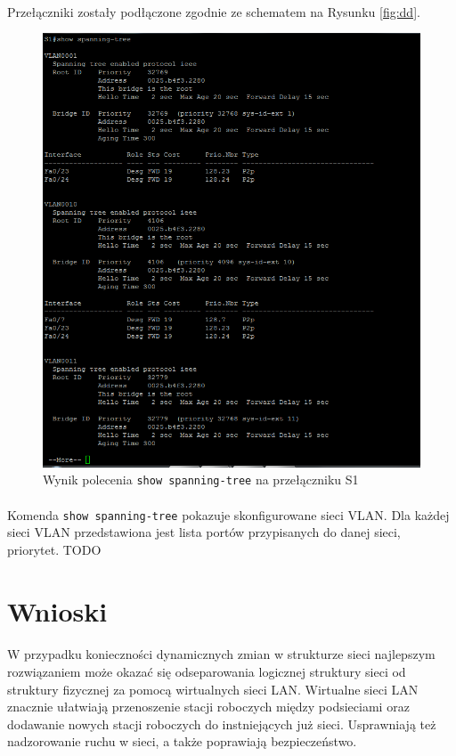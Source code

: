 \documentclass[wide,a4paper,titlepage,12pt] {article}
\begin{document}
  \paragraph{}
  Przełączniki zostały podłączone zgodnie ze schematem na Rysunku \ref{fig:dd}.

  \begin{figure}[H]
    \begin{center}
      \includegraphics[width=\textwidth]{img/t13.PNG}
      \caption{Wynik polecenia \texttt{show spanning-tree} na przełączniku S1}
    \end{center}
  \end{figure}

  \paragraph{}
  Komenda \texttt{show spanning-tree} pokazuje skonfigurowane sieci VLAN. Dla każdej sieci VLAN przedstawiona jest lista portów przypisanych do danej sieci, priorytet. TODO


  \section{Wnioski}
  \paragraph{}
  W przypadku konieczności dynamicznych zmian w strukturze sieci najlepszym rozwiązaniem może okazać się odseparowania logicznej struktury sieci od struktury fizycznej za pomocą wirtualnych sieci LAN.
  Wirtualne sieci LAN znacznie ułatwiają przenoszenie stacji roboczych między podsieciami oraz dodawanie nowych stacji roboczych do instniejących już sieci. Usprawniają też nadzorowanie ruchu w sieci, a także poprawiają bezpieczeństwo.
\end{document}
